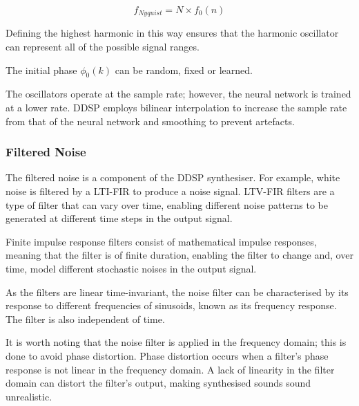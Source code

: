 \begin{equation}
    f_{Nyquist} = N \times f_0(n)
\end{equation}

Defining the highest harmonic in this way ensures that the harmonic oscillator can represent all of the possible signal ranges.

The initial phase $\phi_0(k)$ can be random, fixed or learned\cite{OriginalDDSP}.

The oscillators operate at the sample rate; however, the neural network is trained at a lower rate. DDSP employs bilinear interpolation to increase the sample rate from that of the neural network and smoothing to prevent artefacts.

\vspace{0.5cm}
\vspace{0.5cm}

\subsubsection{Filtered Noise}

The filtered noise is a component of the DDSP synthesiser. For example, white noise is filtered by a \acrfull{LTI-FIR} to produce a noise signal. LTV-FIR filters are a type of filter that can vary over time, enabling different noise patterns to be generated at different time steps in the output signal.

Finite impulse response filters consist of mathematical impulse responses, meaning that the filter is of finite duration, enabling the filter to change and, over time, model different stochastic noises in the output signal.

As the filters are linear time-invariant, the noise filter can be characterised by its response to different frequencies of sinusoids, known as its frequency response. The filter is also independent of time.

It is worth noting that the noise filter is applied in the frequency domain; this is done to avoid phase distortion. Phase distortion occurs when a filter's phase response is not linear in the frequency domain. A lack of linearity in the filter domain can distort the filter's output, making synthesised sounds sound unrealistic.

